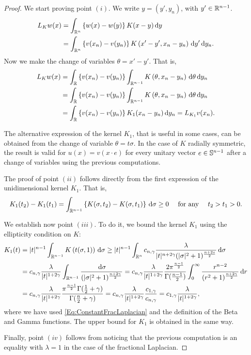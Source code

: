 \begin{proof}
	We start proving point $(i)$. We write $y=(y',y_n)$, with $y'\in \mathbb{R}^{n-1}$.
	\begin{align*}
	L_K w(x) &= \int_{\mathbb{R}^n} \left\{ w(x)-w(y) \right\} K(x-y) \,\mathrm{d} y \\
	&=\int_{\mathbb{R}^n} \left\{ v(x_n)-v(y_n) \right\} K\left(x'-y',x_n-y_n\right) \,\mathrm{d} y' \,\mathrm{d} y_n.
	\end{align*}
	Now we make the change of variables $\theta = x'-y'$. That is,
	\begin{align*}
	L_K w(x) &= \int_{\mathbb{R}} \left\{ v(x_n)-v(y_n) \right\} \int_{\mathbb{R}^{n-1}} K\left(\theta,x_n-y_n\right) \,\mathrm{d} \theta \,\mathrm{d} y_n \\
	&= \int_{\mathbb{R}} \left\{ v(x_n)-v(y_n) \right\} \int_{\mathbb{R}^{n-1}} K\left(\theta,x_n-y_n\right) \,\mathrm{d}\theta \,\mathrm{d} y_n \\
	&= \int_{\mathbb{R}} \left\{ v(x_n)-v(y_n) \right\} K_1(x_n-y_n ) \,\mathrm{d} y_n = L_{K_1}v(x_n).
	\end{align*}
	
	The alternative expression of the kernel $K_1$, that is useful in some cases, can be obtained from the change of variable $\theta = t\sigma$.	In the case of $K$ radially symmetric, the result is valid for $u(x) = v(x\cdot e)$ for every unitary vector $e\in \mathbb{S}^{n-1}$ after a change of variables using the previous computations.
	
	The proof of point $(ii)$ follows directly from the first expression of the unidimensional kernel $K_1$. That is,
	$$ K_1(t_2)-K_1(t_1) = \int_{\mathbb{R}^{n-1}} \left\{ K(\sigma,t_2) - K(\sigma,t_1)\right\} \,\mathrm{d} \sigma \geq 0 \quad \text{ for any } \quad t_2>t_1>0. $$
	
	We establish now point $(iii)$. To do it, we bound the kernel $K_1$ using the ellipticity condition on $K$:
	\begin{align*}
	K_1(t) &= |t|^{n-1} \int_{\mathbb{R}^{n-1}} K\left(t(\sigma,1)\right) \,\mathrm{d}\sigma \geq |t|^{n-1} \int_{\mathbb{R}^n} c_{n,\gamma} \frac{\lambda}{|t|^{n+2\gamma}(|\sigma|^2+1)^{\frac{n+2s}{2}}} \,\mathrm{d}\sigma \\
	&= c_{n,\gamma} \frac{\lambda}{|t|^{1+2\gamma}} \int_{\mathbb{R}^{n-1}} \frac{\,\mathrm{d}\sigma}{(|\sigma|^2+1)^{\frac{n+2\gamma}{2}}} = c_{n,\gamma} \frac{\lambda}{|t|^{1+2\gamma}} \dfrac{2 \pi^{\frac{n-1}{2}}}{\Gamma(\frac{n-1}{2})} \int_0^\infty \dfrac{r^{n-2}}{(r^2+1)^{\frac{n+2\gamma}{2}}} \,\mathrm{d} r \\	
	& = c_{n,\gamma} \frac{\lambda}{|t|^{1+2\gamma}} 
	\dfrac{\pi^{\frac{n-1}{2}} \Gamma(\frac{1}{2}+\gamma)}{\Gamma(\frac{n}{2}+\gamma)} 
	= c_{n,\gamma} \frac{\lambda}{|t|^{1+2\gamma}} \frac{c_{1,\gamma}}{c_{n,\gamma}} = c_{1,\gamma} \frac{\lambda}{|t|^{1+2\gamma}},
	\end{align*}
	where we have used \eqref{Eq:ConstantFracLaplacian} and the definition of the Beta and Gamma functions. The upper bound for $K_1$ is obtained in the same way.
	
	Finally, point $(iv)$ follows from noticing that the previous computation is an equality with $\lambda = 1$ in the case of the fractional Laplacian.
\end{proof}






